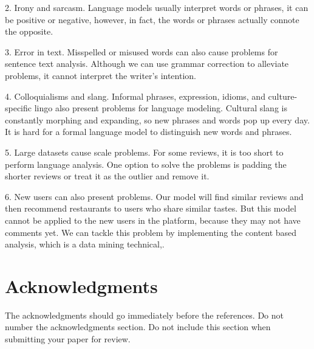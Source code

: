 \documentclass[11pt]{article}
\begin{document}
2. Irony and sarcasm. Language models usually interpret words or phrases, it can be positive or negative, however, in fact, the words or phrases actually connote the opposite.

3. Error in text.  Misspelled or misused words can also cause problems for sentence text analysis. Although we can use grammar correction to alleviate problems, it cannot interpret the writer's intention.

4. Colloquialisms and slang. Informal phrases, expression, idioms, and culture-specific lingo also present problems for language modeling. Cultural slang is constantly morphing and expanding, so new phrases and words pop up every day. It is hard for a formal language model to distinguish new words and phrases.

5. Large datasets cause scale problems. For some reviews, it is too short to perform language analysis. One option to solve the problems is padding the shorter reviews or treat it as the outlier and remove it. 

6. New users can also present problems. Our model will find similar reviews and then recommend restaurants to users who share similar tastes. But this model cannot be applied to the new users in the platform, because they may not have comments yet. We can tackle this problem by implementing the content based analysis, which is a data mining technical,. 



\section*{Acknowledgments}

The acknowledgments should go immediately before the references.  Do
not number the acknowledgments section. Do not include this section
when submitting your paper for review.



\end{document}
